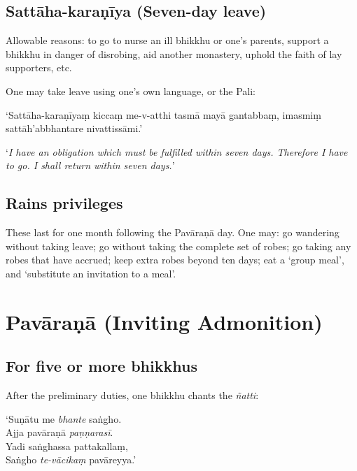 \subsection{Sattāha-karaṇīya (Seven-day leave)}

Allowable reasons: to go to nurse an ill bhikkhu or one's parents, support a
bhikkhu in danger of disrobing, aid another monastery, uphold the faith of lay
supporters, etc.

One may take leave using one's own language, or the Pali:

‘Sattāha-karaṇīyaṃ kiccaṃ me-v-atthi tasmā mayā gantabbaṃ, imasmiṃ
sattāh'abbhantare nivattissāmi.’

‘\emph{I have an obligation which must be fulfilled within seven days. Therefore
  I have to go. I shall return within seven days.}’\\
\mbox{}

\subsection{Rains privileges}
\label{rains-privileges}

These last for one month following the Pavāraṇā day. One may: go wandering
without taking leave; go without taking the complete set of robes; go taking any
robes that have accrued; keep extra robes beyond ten days; eat a ‘group meal’,
and ‘substitute an invitation to a meal’.

\section{Pavāraṇā (Inviting Admonition)}

\subsection{For five or more bhikkhus}

After the preliminary duties, one bhikkhu chants the \emph{ñatti}:

\vspace*{\parskip}

\begin{paritta}
‘Suṇātu me \emph{bhante} saṅgho.\\
Ajja pavāraṇā \emph{paṇṇarasī}.\\
Yadi saṅghassa pattakallaṃ,\\
Saṅgho \emph{te-vācikaṃ} pavāreyya.’
\end{paritta}

